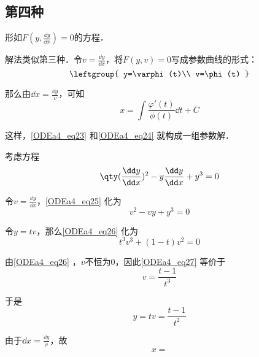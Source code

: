 \subsection{第四种}

形如$F(y, \frac{\dd y}{\dd x})=0$的方程．

解法类似第三种．令$v=\frac{\dd y}{\dd x}$，将$F(y, v)=0$写成参数曲线的形式：
\begin{equation}\label{ODEa4_eq23}
\leftgroup{
    y=\varphi(t)\\
    v=\phi(t)
}
\end{equation}

那么由$\dd x=\frac{\dd y}{v}$，可知
\begin{equation}\label{ODEa4_eq24}
x=\int \frac{\varphi'(t)}{\phi(t)}\dd t+C
\end{equation}

这样，\autoref{ODEa4_eq23} 和\autoref{ODEa4_eq24} 就构成一组参数解．

\begin{example}{}
考虑方程
\begin{equation}\label{ODEa4_eq25}
\qty(\frac{\dd y}{\dd x})^2-y\frac{\dd y}{\dd x}+y^3=0
\end{equation}

令$v=\frac{\dd y}{\dd x}$，\autoref{ODEa4_eq25} 化为
\begin{equation}\label{ODEa4_eq26}
v^2-vy+y^3=0
\end{equation}

令$y=tv$，那么\autoref{ODEa4_eq26} 化为
\begin{equation}\label{ODEa4_eq27}
t^3v^3+(1-t)v^2=0
\end{equation}

由\autoref{ODEa4_eq26} ，$v$不恒为$0$，因此\autoref{ODEa4_eq27} 等价于
\begin{equation}
v=\frac{t-1}{t^3}
\end{equation}

于是
\begin{equation}
y=tv=\frac{t-1}{t^2}
\end{equation}

由于$\dd x=\frac{\dd y}{v}$，故
\begin{equation}
\begin{aligned}
x=
\end{aligned}
\end{equation}









\end{example}












